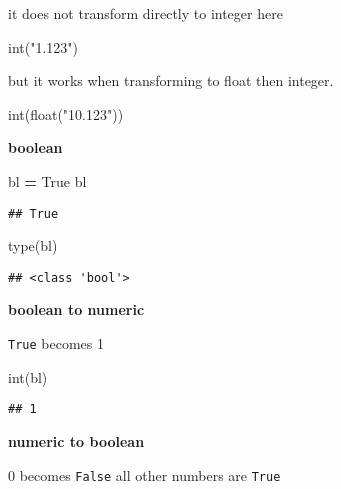 \documentclass[
]{book}
\newenvironment{Shaded}{\begin{snugshade}}{\end{snugshade}}
\newcommand{\BuiltInTok}[1]{#1}
\newcommand{\NormalTok}[1]{#1}
\newcommand{\OperatorTok}[1]{\textcolor[rgb]{0.81,0.36,0.00}{\textbf{#1}}}
\newcommand{\StringTok}[1]{\textcolor[rgb]{0.31,0.60,0.02}{#1}}
\newcommand{\VariableTok}[1]{\textcolor[rgb]{0.00,0.00,0.00}{#1}}
\begin{document}
it does not transform directly to integer here

\begin{Shaded}
\begin{Highlighting}[]
\BuiltInTok{int}\NormalTok{(}\StringTok{"1.123"}\NormalTok{)}
\end{Highlighting}
\end{Shaded}

but it works when transforming to float then integer.

\begin{Shaded}
\begin{Highlighting}[]
\BuiltInTok{int}\NormalTok{(}\BuiltInTok{float}\NormalTok{(}\StringTok{"10.123"}\NormalTok{))}
\end{Highlighting}
\end{Shaded}

\textbf{boolean}

\begin{Shaded}
\begin{Highlighting}[]
\NormalTok{bl }\OperatorTok{=} \VariableTok{True}
\NormalTok{bl}
\end{Highlighting}
\end{Shaded}

\begin{verbatim}
## True
\end{verbatim}

\begin{Shaded}
\begin{Highlighting}[]
\BuiltInTok{type}\NormalTok{(bl)}
\end{Highlighting}
\end{Shaded}

\begin{verbatim}
## <class 'bool'>
\end{verbatim}

\textbf{boolean to numeric}

\texttt{True} becomes 1

\begin{Shaded}
\begin{Highlighting}[]
\BuiltInTok{int}\NormalTok{(bl)}
\end{Highlighting}
\end{Shaded}

\begin{verbatim}
## 1
\end{verbatim}

\textbf{numeric to boolean}

0 becomes \texttt{False}
all other numbers are \texttt{True}
\end{document}
